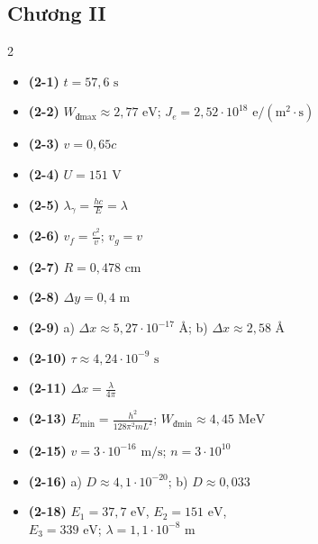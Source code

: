 \documentclass[11pt,a4paper]{article}
\begin{document}
\subsection*{Chương II}
\begin{multicols}{2}
\begin{itemize}[itemsep=0.5pt, topsep=1pt, parsep=0pt, leftmargin=1.8em]
  \item \textbf{(2-1)} $t = 57{,}6\text{ s}$
  \item \textbf{(2-2)} $W_{\text{đ}\max} \approx 2{,}77\text{ eV}$; $J_e = 2{,}52 \cdot 10^{18}\text{ e}/(\text{m}^2\cdot\text{s})$
  \item \textbf{(2-3)} $v = 0{,}65c$
  \item \textbf{(2-4)} $U = 151\text{ V}$
  \item \textbf{(2-5)} $\lambda_\gamma = \frac{hc}{E} = \lambda$
  \item \textbf{(2-6)} $v_f = \frac{c^2}{v}$; $v_g = v$
  \item \textbf{(2-7)} $R = 0{,}478\text{ cm}$
  \item \textbf{(2-8)} $\Delta y = 0{,}4\text{ m}$
  \item \textbf{(2-9)} a) $\Delta x \approx 5{,}27 \cdot 10^{-17}\text{ \AA}$; b) $\Delta x \approx 2{,}58\text{ \AA}$
  \item \textbf{(2-10)} $\tau \approx 4{,}24 \cdot 10^{-9}\text{ s}$
  \item \textbf{(2-11)} $\Delta x = \frac{\lambda}{4\pi}$
  \item \textbf{(2-13)} $E_{\min} = \frac{h^2}{128\pi^2 m L^2}$; $W_{\text{đ}\min} \approx 4{,}45\text{ MeV}$
  \item \textbf{(2-15)} $v = 3 \cdot 10^{-16}\text{ m/s}$; $n = 3 \cdot 10^{10}$
  \item \textbf{(2-16)} a) $D \approx 4{,}1 \cdot 10^{-20}$; b) $D \approx 0{,}033$
  \item \textbf{(2-18)} $E_1 = 37{,}7\text{ eV}$, $E_2 = 151\text{ eV}$,\\
  $E_3 = 339\text{ eV}$; $\lambda = 1{,}1 \cdot 10^{-8}\text{ m}$
\end{itemize}
\end{multicols}
\end{document}
